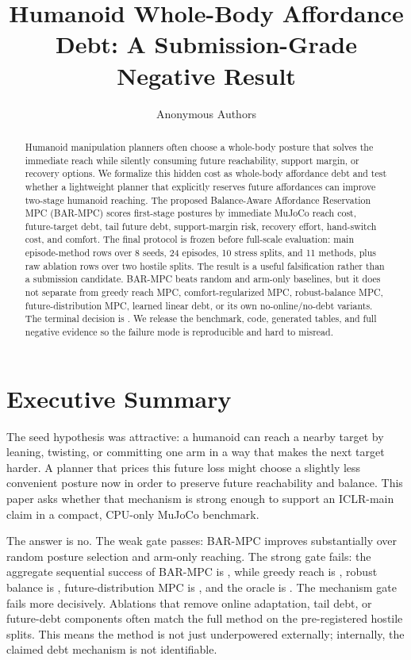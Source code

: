\documentclass{article}
\title{Humanoid Whole-Body Affordance Debt: A Submission-Grade Negative Result}
\author{Anonymous Authors}
\newcommand{\method}{\textsc{BAR-MPC}}
\begin{document}
\maketitle

\begin{abstract}
Humanoid manipulation planners often choose a whole-body posture that solves the immediate reach while silently consuming future reachability, support margin, or recovery options. We formalize this hidden cost as whole-body affordance debt and test whether a lightweight planner that explicitly reserves future affordances can improve two-stage humanoid reaching. The proposed Balance-Aware Affordance Reservation MPC (\method{}) scores first-stage postures by immediate MuJoCo reach cost, future-target debt, tail future debt, support-margin risk, recovery effort, hand-switch cost, and comfort. The final protocol is frozen before full-scale evaluation: \MainRows{} main episode-method rows over 8 seeds, 24 episodes, 10 stress splits, and 11 methods, plus \AblationRows{} raw ablation rows over two hostile splits. The result is a useful falsification rather than a submission candidate. \method{} beats random and arm-only baselines, but it does not separate from greedy reach MPC, comfort-regularized MPC, robust-balance MPC, future-distribution MPC, learned linear debt, or its own no-online/no-debt variants. The terminal decision is \PaperDecision{}. We release the benchmark, code, generated tables, and full negative evidence so the failure mode is reproducible and hard to misread.
\end{abstract}

\section{Executive Summary}

The seed hypothesis was attractive: a humanoid can reach a nearby target by leaning, twisting, or committing one arm in a way that makes the next target harder. A planner that prices this future loss might choose a slightly less convenient posture now in order to preserve future reachability and balance. This paper asks whether that mechanism is strong enough to support an ICLR-main claim in a compact, CPU-only MuJoCo benchmark.

The answer is no. The weak gate passes: \method{} improves substantially over random posture selection and arm-only reaching. The strong gate fails: the aggregate sequential success of \method{} is \BARAggregateSuccess{}, while greedy reach is \GreedyAggregateSuccess{}, robust balance is \RobustAggregateSuccess{}, future-distribution MPC is \FutureAggregateSuccess{}, and the oracle is \OracleAggregateSuccess{}. The mechanism gate fails more decisively. Ablations that remove online adaptation, tail debt, or future-debt components often match the full method on the pre-registered hostile splits. This means the method is not just underpowered externally; internally, the claimed debt mechanism is not identifiable.
\end{document}
